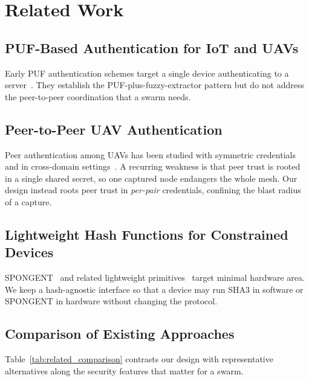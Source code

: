 \documentclass[11pt,a4paper]{article}
\begin{document}
\section{Related Work}
\label{sec:related}

\subsection{PUF-Based Authentication for IoT and UAVs}
Early PUF authentication schemes target a single device authenticating to a
server~\cite{puf_lightweight_uav,puf_iot_strong_adversary,arbiter_puf_iot}.
They establish the PUF-plus-fuzzy-extractor pattern but do not address the
peer-to-peer coordination that a swarm needs.

\subsection{Peer-to-Peer UAV Authentication}
Peer authentication among UAVs has been studied with symmetric
credentials~\cite{peer2peer_auth} and in cross-domain
settings~\cite{puf_uav_cross_domain,puf_6g_uav}. A recurring weakness is that
peer trust is rooted in a single shared secret, so one captured node endangers
the whole mesh. Our design instead roots peer trust in \emph{per-pair}
credentials, confining the blast radius of a capture.

\subsection{Lightweight Hash Functions for Constrained Devices}
SPONGENT~\cite{spongent_original} and related lightweight
primitives~\cite{lightweight_crypto_evaluation} target minimal hardware area.
We keep a hash-agnostic interface so that a device may run SHA3 in software or
SPONGENT in hardware without changing the protocol.

\subsection{Comparison of Existing Approaches}

Table~\ref{tab:related_comparison} contrasts our design with representative
alternatives along the security features that matter for a swarm.
\end{document}
